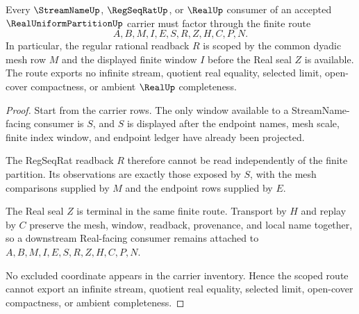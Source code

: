 \begin{theorem}
\label{thm:real-uniform-partition-regseqrat-scope}
Every $\StreamNameUp$, $\RegSeqRatUp$, or $\RealUp$ consumer of an accepted $\RealUniformPartitionUp$ carrier must factor through the finite route
$$
A,B,M,I,E,S,R,Z,H,C,P,N.
$$
In particular, the regular rational readback $R$ is scoped by the common dyadic mesh row $M$ and the displayed finite window $I$ before the Real seal $Z$ is available. The route exports no infinite stream, quotient real equality, selected limit, open-cover compactness, or ambient $\RealUp$ completeness.
\end{theorem}
\begin{proof}
Start from the carrier rows. The only window available to a StreamName-facing consumer is $S$, and $S$ is displayed after the endpoint names, mesh scale, finite index window, and endpoint ledger have already been projected.

The RegSeqRat readback $R$ therefore cannot be read independently of the finite partition. Its observations are exactly those exposed by $S$, with the mesh comparisons supplied by $M$ and the endpoint rows supplied by $E$.

The Real seal $Z$ is terminal in the same finite route. Transport by $H$ and replay by $C$ preserve the mesh, window, readback, provenance, and local name together, so a downstream Real-facing consumer remains attached to $A,B,M,I,E,S,R,Z,H,C,P,N$.

No excluded coordinate appears in the carrier inventory. Hence the scoped route cannot export an infinite stream, quotient real equality, selected limit, open-cover compactness, or ambient completeness.
\end{proof}



